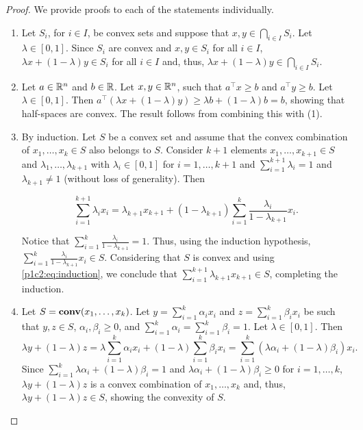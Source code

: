 \begin{proof}
	We provide proofs to each of the statements individually. 
	\begin{enumerate}
	 \item Let 	$S_i$, for $i \in I$, be convex sets and suppose that $x, y \in \bigcap_{i \in I} S_i$. Let $\lambda \in [0,1]$. Since $S_i$ are convex and $x,y \in S_i$ for all $i \in I$, $\lambda x + (1-\lambda) y \in S_i$ for all $i \in I$ and, thus, $\lambda x + (1-\lambda) y \in \bigcap_{i \in I} S_i$.
	
	\item Let $a \in \mathbb{R}^n$ and $b \in \mathbb{R}$. Let $x,y \in \mathbb{R}^n$, such that $a^\top x \geq b$ and $a^\top y \geq b$. Let $\lambda \in [0,1]$. Then $a^\top (\lambda x + (1-\lambda)y) \geq \lambda b + (1-\lambda)b = b$, showing that half-spaces are convex. The result follows from combining this with (1).    
	
	\item By induction. Let $S$ be a convex set and assume that the convex combination of $x_1, \dots, x_k \in S$ also belongs to $S$. Consider $k+1$ elements $x_1, \dots, x_{k+1} \in S$ and $\lambda_1, \dots, \lambda_{k+1}$ with $\lambda_i \in [0,1]$ for $i = 1,\dots, k+1$ and $\sum_{i=1}^{k+1}\lambda_i = 1$ and $\lambda_{k+1} \neq 1$ (without loss of generality). Then

	\begin{equation}
		\sum_{i=1}^{k+1}\lambda_i x_i = \lambda_{k+1}x_{k+1} + (1 - \lambda_{k+1}) \sum_{i=1}^k \frac{\lambda_i}{1 - \lambda_{k+1}}x_i. \label{p1c2:eq:induction}
	\end{equation}								

		Notice that $\sum_{i=1}^{k}\frac{\lambda_i}{1 - \lambda_{k+1}} = 1$. Thus, using the induction hypothesis, $\sum_{i=1}^{k}\frac{\lambda_i}{1 - \lambda_{k+1}}x_i \in S$. Considering that $S$ is convex and using \eqref{p1c2:eq:induction}, we conclude that $\sum_{i=1}^{k+1}\lambda_{k+1}x_{k+1} \in S$, completing the induction.
		
	\item Let $S = \mathop{\bf conv}(x_1, \dots, x_k)$. Let $y = \sum_{i=1}^k \alpha_i x_i$ and $z = \sum_{i=1}^k \beta_ix_i$ be such that $y,z \in S$, $\alpha_i,\beta_i \geq 0$, and $\sum_{i=1}^k \alpha_i = \sum_{i=1}^k \beta_i = 1$. Let $\lambda \in [0,1]$. Then
		\begin{equation}
			\lambda y + (1- \lambda)z = \lambda\sum_{i=1}^k \alpha_i x_i + (1-\lambda)\sum_{i=1}^k \beta_i x_i = \sum_{i=1}^k (\lambda \alpha_i + (1-\lambda) \beta_i)x_i. 	
		\end{equation}
		Since $\sum_{i=1}^k \lambda \alpha_i + (1-\lambda) \beta_i = 1$ and $\lambda \alpha_i + (1-\lambda) \beta_i \geq 0$ for $i=1,\dots,k$, $\lambda y + (1- \lambda)z$ is a convex combination of $x_1, \dots, x_k$ and, thus, $\lambda y + (1- \lambda)z \in S$, showing the convexity of $S$. \qedhere	
	\end{enumerate}	
\end{proof}

